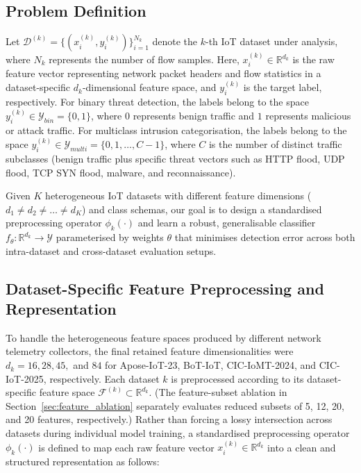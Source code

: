 \documentclass[a4paper,fleqn]{cas-sc}
\begin{document}
\subsection{Problem Definition}

Let $\mathcal{D}^{(k)} = \{(x_i^{(k)}, y_i^{(k)})\}_{i=1}^{N_k}$ denote the $k$-th IoT dataset under analysis, where $N_k$ represents the number of flow samples. Here, $x_i^{(k)} \in \mathbb{R}^{d_k}$ is the raw feature vector representing network packet headers and flow statistics in a dataset-specific $d_k$-dimensional feature space, and $y_i^{(k)}$ is the target label, respectively. For binary threat detection, the labels belong to the space $y_i^{(k)} \in \mathcal{Y}_{bin} = \{0, 1\}$, where $0$ represents benign traffic and $1$ represents malicious or attack traffic. For multiclass intrusion categorisation, the labels belong to the space $y_i^{(k)} \in \mathcal{Y}_{multi} = \{0, 1, \dots, C-1\}$, where $C$ is the number of distinct traffic subclasses (benign traffic plus specific threat vectors such as HTTP flood, UDP flood, TCP SYN flood, malware, and reconnaissance).

Given $K$ heterogeneous IoT datasets with different feature dimensions ($d_1 \neq d_2 \neq \dots \neq d_K$) and class schemas, our goal is to design a standardised preprocessing operator $\phi_k(\cdot)$ and learn a robust, generalisable classifier $f_\theta: \mathbb{R}^{d_k} \rightarrow \mathcal{Y}$ parameterised by weights $\theta$ that minimises detection error across both intra-dataset and cross-dataset evaluation setups.

\subsection{Dataset-Specific Feature Preprocessing and Representation}

To handle the heterogeneous feature spaces produced by different network telemetry collectors, the final retained feature dimensionalities were $d_k = 16, 28, 45,$ and $84$ for Apose-IoT-23, BoT-IoT, CIC-IoMT-2024, and CIC-IoT-2025, respectively. Each dataset $k$ is preprocessed according to its dataset-specific feature space $\mathcal{F}^{(k)} \subset \mathbb{R}^{d_k}$. (The feature-subset ablation in Section~\ref{sec:feature_ablation} separately evaluates reduced subsets of 5, 12, 20, and 20 features, respectively.) Rather than forcing a lossy intersection across datasets during individual model training, a standardised preprocessing operator $\phi_k(\cdot)$ is defined to map each raw feature vector $x_i^{(k)} \in \mathbb{R}^{d_k}$ into a clean and structured representation as follows:
\end{document}
